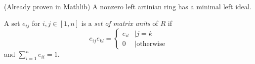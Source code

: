 \begin{theorem}
  \label{thm:artinian_has_minimal_left_ideal}
  \leanok
  (Already proven in Mathlib) A nonzero left artinian ring has a minimal left ideal.
\end{theorem}

\begin{definition}
  \label{def:matrixunits}
  \leanok
  A set $e_{ij}$ for $i, j \in [1, n]$ is a \textit{set of matrix units} of $R$ if
  $$
    e_{ij}e_{kl} =
    \begin{cases}
      e_{il} & \mid j = k            \\
      0      & \mid \text{otherwise}\end{cases}
  $$
  and $\sum_{i=1}^n e_{ii} = 1$.
\end{definition}

